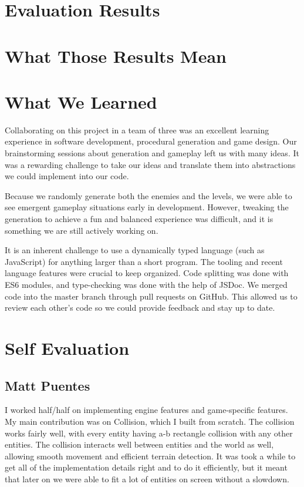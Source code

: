 \documentclass[a4paper, 12pt]{article}
\begin{document}

\section{Evaluation Results}



\section{What Those Results Mean}



\section{What We Learned}

Collaborating on this project in a team of three was an excellent learning
experience in software development, procedural generation and game design. Our
brainstorming sessions about generation and gameplay left us with many ideas. It
was a rewarding challenge to take our ideas and translate them into abstractions
we could implement into our code.

Because we randomly generate both the enemies and the levels, we were able to
see emergent gameplay situations early in development. However, tweaking the
generation to achieve a fun and balanced experience was difficult, and it is
something we are still actively working on.

It is an inherent challenge to use a dynamically typed language (such as
JavaScript) for anything larger than a short program. The tooling and recent
language features were crucial to keep organized. Code splitting was done with
ES6 modules, and type-checking was done with the help of JSDoc. We merged code
into the master branch through pull requests on GitHub. This allowed us to
review each other's code so we could provide feedback and stay up to date.



\section{Self Evaluation}

\subsection{Matt Puentes}

I worked half/half on implementing engine features and game-specific features.
My main contribution was on Collision, which I built from scratch. The collision
works fairly well, with every entity having a-b rectangle collision with any
other entities. The collision interacts well between entities and the world as
well, allowing smooth movement and efficient terrain detection. It was took a
while to get all of the implementation details right and to do it efficiently, 
but it meant that later on we were able to fit a lot of entities on screen
without a slowdown.
\end{document}
